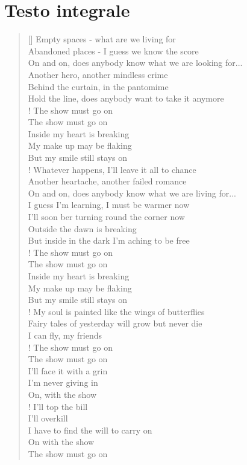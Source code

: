 \documentclass[12pt]{article}
\newcommand{\attrib}[1]{%
\nopagebreak{\raggedleft\footnotesize #1\par}}
\begin{document}
\section{Testo integrale}
\vspace{3cm}
\settowidth{\versewidth}{On and on, does anybody know what we are looking for...}
\begin{verse}[\versewidth]
 Empty spaces - what are we living for \\
 Abandoned places - I guess we know the score \\
 On and on, does anybody know what we are looking for... \\
 Another hero, another mindless crime \\
 Behind the curtain, in the pantomime \\
 Hold the line, does anybody want to take it anymore\\!
 The show must go on \\
 The show must go on \\
 Inside my heart is breaking \\
 My make up may be flaking \\
 But my smile still stays on \\!
 Whatever happens, I'll leave it all to chance \\
 Another heartache, another failed romance \\
 On and on, does anybody know what we are living for... \\
 I guess I'm learning, I must be warmer now \\
 I'll soon ber turning round the corner now \\
 Outside the dawn is breaking \\
 But inside in the dark I'm aching to be free \\!
 The show must go on \\
 The show must go on \\
 Inside my heart is breaking \\
 My make up may be flaking \\
 But my smile still stays on \\!
 My soul is painted like the wings of butterflies \\
 Fairy tales of yesterday will grow but never die \\
 I can fly, my friends \\!
 The show must go on \\
 The show must go on \\
 I'll face it with a grin \\
 I'm never giving in \\
 On, with the show \\!
 I'll top the bill \\
 I'll overkill \\
 I have to find the will to carry on \\
 On with the show \\
 The show must go on
\end{verse}
\attrib{Brian May, 1991}
\end{document}
